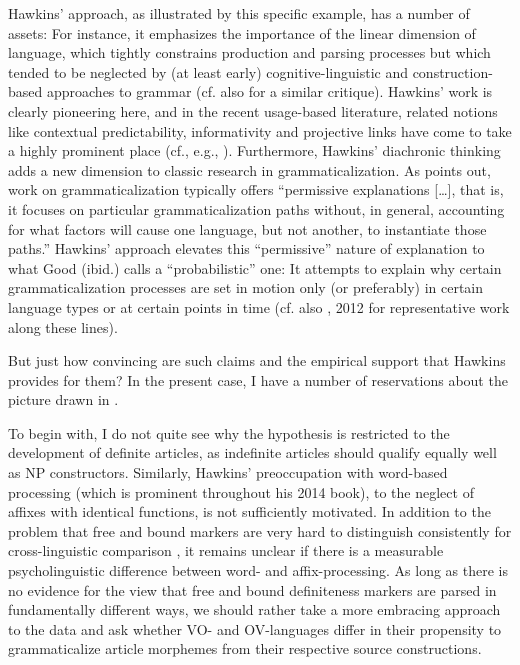 \documentclass[output=paper]{langsci/langscibook}
\begin{document}
Hawkins’ approach, as illustrated by this specific example, has a number of assets: For instance, it emphasizes the importance of the linear dimension of language, which tightly constrains production and parsing processes but which tended to be neglected by (at least early) cognitive-linguistic and construction-based approaches to grammar (cf. also \citealt{Diessel2011} for a similar critique). Hawkins’ work is clearly pioneering here, and in the recent usage-based literature, related notions like contextual predictability, informativity and projective links have come to take a highly prominent place (cf., e.g., \citealt{GahlGarnsey2004,Levy2008,Auer2009}). Furthermore, Hawkins’ diachronic thinking adds a new dimension to classic research in grammaticalization. As \citet[7]{Good2008} points out, work on grammaticalization typically offers “permissive explanations […], that is, it focuses on particular grammaticalization paths without, in general, accounting for what factors will cause one language, but not another, to instantiate those paths.” Hawkins’ approach elevates this “permissive” nature of explanation to what Good (ibid.) calls a “probabilistic” one: It attempts to explain why certain grammaticalization processes are set in motion only (or preferably) in certain language types or at certain points in time (cf. also \citealt{Hawkins1986}, 2012 for representative work along these lines).

But just how convincing are such claims and the empirical support that Hawkins provides for them? In the present case, I have a number of reservations about the picture drawn in \citet{Hawkins2014}.

To begin with, I do not quite see why the hypothesis is restricted to the development of definite articles, as indefinite articles should qualify equally well as NP constructors. Similarly, Hawkins’ preoccupation with word-based processing (which is prominent throughout his 2014 book), to the neglect of affixes with identical functions, is not sufficiently motivated. In addition to the problem that free and bound markers are very hard to distinguish consistently for cross-linguistic comparison \citep{Haspelmath2011}, it remains unclear if there is a measurable psycholinguistic difference between word- and affix-processing. As long as there is no evidence for the view that free and bound definiteness markers are parsed in fundamentally different ways, we should rather take a more embracing approach to the data and ask whether VO- and OV-languages differ in their propensity to grammaticalize article morphemes from their respective source constructions.
\end{document}
